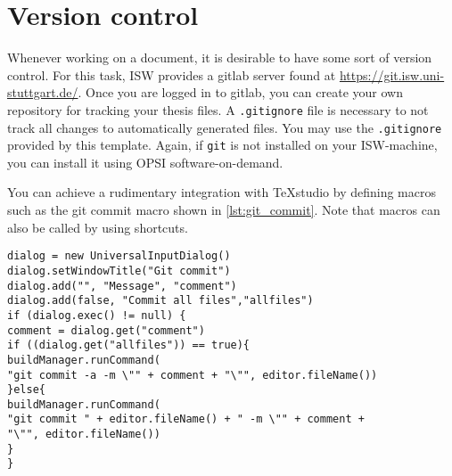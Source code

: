 \section{Version control}
\label{sec:version_control}
Whenever working on a document, it is desirable to have some sort of version control. For this task, \ac{ISW} provides a gitlab server found at \url{https://git.isw.uni-stuttgart.de/}. Once you are logged in to gitlab, you can create your own repository for tracking your thesis files. A \texttt{.gitignore} file is necessary to not track all changes to automatically generated files. You may use the \texttt{.gitignore} provided by this template. Again, if \texttt{git} is not installed on your \ac{ISW}-machine, you can install it using OPSI software-on-demand.

You can achieve a rudimentary integration with TeXstudio by defining macros such as the git commit macro shown in \autoref{lst:git_commit}. Note that macros can also be called by using shortcuts.

\begin{lstlisting}[caption={\texttt{git commit} macro}, label={lst:git_commit}]
%SCRIPT
dialog = new UniversalInputDialog()
dialog.setWindowTitle("Git commit")
dialog.add("", "Message", "comment")
dialog.add(false, "Commit all files","allfiles")
if (dialog.exec() != null) {
comment = dialog.get("comment")
if ((dialog.get("allfiles")) == true){
buildManager.runCommand(
"git commit -a -m \"" + comment + "\"", editor.fileName())
}else{
buildManager.runCommand(
"git commit " + editor.fileName() + " -m \"" + comment +
"\"", editor.fileName())
}
}
\end{lstlisting}
